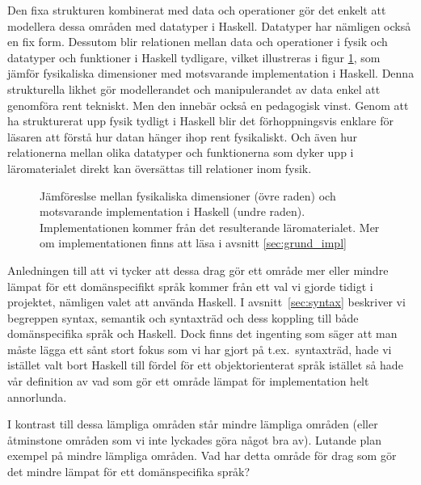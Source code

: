 \begin{draft}
Den fixa strukturen kombinerat med data och operationer gör det enkelt att
modellera dessa områden med datatyper i Haskell. Datatyper har nämligen också en
fix form. Dessutom blir relationen mellan data och operationer i fysik och
datatyper och funktioner i Haskell tydligare, vilket illustreras i  figur \ref{fig:haskell_fysik_likhet}, som jämför fysikaliska dimensioner med motsvarande implementation i Haskell. Denna strukturella likhet gör
modellerandet och manipulerandet av data enkel att genomföra rent tekniskt. Men
den innebär också en pedagogisk vinst. Genom att ha strukturerat upp fysik
tydligt i Haskell blir det förhoppningsvis enklare för läsaren att förstå hur
datan hänger ihop rent fysikaliskt. Och även hur relationerna mellan olika
datatyper och funktionerna som dyker upp i läromaterialet direkt kan översättas
till relationer inom fysik.

\begin{figure}[tph]
  \centering
  \caption{Jämföreslse mellan fysikaliska dimensioner (övre raden) och motsvarande implementation i Haskell (undre raden). Implementationen kommer från det resulterande läromaterialet. Mer om implementationen finns att läsa i avsnitt \ref{sec:grund_impl}}
  \label{fig:haskell_fysik_likhet}
\end{figure}

Anledningen till att vi tycker att dessa drag gör ett område mer eller
mindre lämpat för ett domänspecifikt språk kommer från ett val vi gjorde tidigt
i projektet, nämligen valet att använda Haskell. I avsnitt~\ref{sec:syntax}
beskriver vi begreppen syntax, semantik och syntaxträd och dess koppling till
både domänspecifika språk och Haskell. Dock finns det ingenting som säger att
man måste lägga ett sånt stort fokus som vi har gjort på t.ex.~syntaxträd, hade
vi istället valt bort Haskell till fördel för ett objektorienterat språk
istället så hade vår definition av vad som gör ett område lämpat för
implementation helt annorlunda.

I kontrast till dessa lämpliga områden står mindre lämpliga områden (eller
åtminstone områden som vi inte lyckades göra något bra av). Lutande plan exempel
på mindre lämpliga områden. Vad har detta område för drag som gör det mindre
lämpat för ett domänspecifika språk?


\end{draft}

